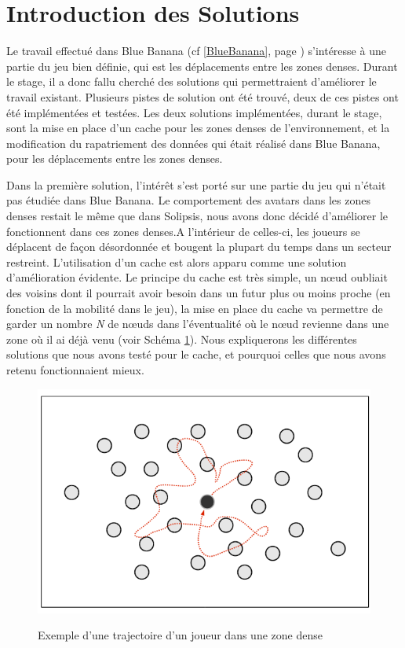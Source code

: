 \section{Introduction des Solutions}
\label{introSolutions}
	Le travail effectué dans Blue Banana (cf \ref{BlueBanana}, page \pageref{BlueBanana}) s'intéresse à une partie du jeu bien définie, qui est les déplacements entre les zones denses. Durant le stage, il a donc fallu cherché des solutions qui permettraient d'améliorer le travail existant. Plusieurs pistes de solution ont été trouvé, deux de ces pistes ont été implémentées et testées. Les deux solutions implémentées, durant le stage, sont la mise en place d'un cache pour les zones denses de l'environnement, et la modification du rapatriement des données qui était réalisé dans Blue Banana, pour les déplacements entre les zones denses.
\par Dans la première solution, l'intérêt s'est porté sur une partie du jeu qui n'était pas étudiée dans Blue Banana. Le comportement des avatars dans les zones denses restait le même que dans Solipsis, nous avons donc décidé d'améliorer le fonctionnent dans ces zones denses.A l'intérieur de celles-ci, les joueurs se déplacent de façon désordonnée et bougent la plupart du temps dans un secteur restreint. L'utilisation d'un cache est alors apparu comme une solution d'amélioration évidente. Le principe du cache est très simple, un nœud oubliait des voisins dont il pourrait avoir besoin dans un futur plus ou moins proche (en fonction de la mobilité dans le jeu), la mise en place du cache va permettre de garder un nombre \textit{N} de nœuds dans l'éventualité où le nœud revienne dans une zone où il ai déjà venu (voir Schéma \ref{mouveDense}). Nous expliquerons les différentes solutions que nous avons testé pour le cache, et pourquoi celles que nous avons retenu fonctionnaient mieux.
	\vspace{5mm}
        \begin{figure}[!h]
        \centering
        \includegraphics[scale=0.45]{./Ressources/Images/mouvementsZoneDense.png}\\
        \caption{Exemple d'une trajectoire d'un joueur dans une zone dense}
        \label{mouveDense}
        \end{figure}
